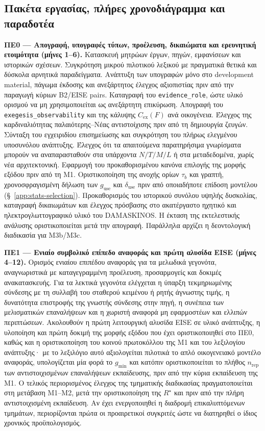 \documentclass[11pt,a4paper]{article}
\begin{document}
\subsection{Πακέτα εργασίας, πλήρες χρονοδιάγραμμα και παραδοτέα}\label{app:impl-wp}

\textbf{ΠΕ0 --- Απογραφή, υπογραφές τύπων, προέλευση, δικαιώματα και ερευνητική ετοιμότητα (μήνες 1--6).} Κατασκευή μητρώων έργων, πηγών, εμφανίσεων και ιστορικών σχέσεων. Συγκρότηση μικρού πιλοτικού λεξικού με πραγματικά θετικά και δύσκολα αρνητικά παραδείγματα. Ανάπτυξη των υπογραφών μόνο στο development material, πάγωμα έκδοσης και ανεξάρτητος έλεγχος αξιοπιστίας πριν από την παραγωγή κύριων B2/EISE pairs. Καταγραφή του \texttt{evidence\_role}, ώστε υλικό ορισμού να μη χρησιμοποιείται ως ανεξάρτητη επικύρωση. Απογραφή του \texttt{exegesis\_observability} και της κάλυψης $C_{\mathrm{ex}}(F)$ ανά οικογένεια. Έλεγχος της καρδιναλιότητας παλαιότερης--Νέας αντιστοίχισης πριν από τη δημιουργία ζευγών. Σύνταξη του εγχειριδίου επισημείωσης και συγκρότηση του πλήρως ελεγμένου υποσυνόλου ανάπτυξης. Έλεγχος ότι τα απαιτούμενα παρατηρήσιμα γνωρίσματα μπορούν να αναπαρασταθούν στα υπάρχοντα $N/T/M/L$ ή στα μεταδεδομένα, χωρίς νέα αρχιτεκτονική. Εφαρμογή του προκαθορισμένου κανόνα επιλογής της μορφής εξόδου πριν από τη M1. Οριστικοποίηση της ανοχής ορίων $\tau_b$ και γραπτή, χρονοσφραγισμένη δήλωση των $g_{\mathrm{use}}$ και $\delta_{\mathrm{use}}$ πριν από οποιαδήποτε επίδοση μοντέλου (§~\ref{app:stats-selection}). Προκαθορισμός του ιστορικού συνόλου υψηλής δυσκολίας, καταγραφή δικαιωμάτων και έλεγχος πρόσβασης στο ακατέργαστο ηχητικό και ηλεκτρογλωττογραφικό υλικό του DAMASKINOS. Η έκταση της εκτελεστικής ανάλυσης οριστικοποιείται μετά την απογραφή. Παράλληλα αρχίζει η δεοντολογική διαδικασία για M3b/M3c.

\textbf{ΠΕ1 --- Ενιαίο συμβολικό επίπεδο αναφοράς και πρώτη αλυσίδα EISE (μήνες 4--12).} Ορισμός ενιαίου επιπέδου αναφοράς για τα μελωδικά γεγονότα, αναγνωριστικά με καταγεγραμμένη προέλευση, προσαρμογείς και δοκιμές ανακατασκευής. Για τα λεκτικά γεγονότα ελέγχεται η ύπαρξη τεκμηριωμένης σύνδεσης με τη συλλαβή του σταθερού κειμένου ή ρητής άγνωστης τιμής, η δυνατότητα επιστροφής της γνωστής σύνδεσης στην πηγή, η συνέπεια των μελισματικών επαναλήψεων και η χωριστή αναφορά μη εφαρμοστέων και ελλιπών περιπτώσεων. Ακολουθούν η πρώτη λειτουργική αλυσίδα EISE σε υλικό ανάπτυξης, η υλοποίηση και πρώτη δοκιμή της μορφής εξόδου που έχει οριστικοποιηθεί στο ΠΕ0, καθώς και η οριστικοποίηση του κοινού πρωτοκόλλου της M1 και του λεξιλογίου ανάπτυξης· με το λεξιλόγιο αυτό αξιολογείται πιλοτικά το απλό οικογενειακό μοντέλο αναφοράς, υπολογίζεται μία φορά το $g_{\min}$ και κατόπιν οριστικοποιείται το πλήθος $n_{\mathrm{rep}}$ των αντιστοιχισμένων επαναλήψεων εκπαίδευσης, πριν από την κύρια εκπαίδευση της M1. Ο τελικός περιορισμένος έλεγχος της τμηματικής διαδικασίας πραγματοποιείται στη μετάβαση M1--M2, μετά την οριστικοποίηση της $R^\star$ και πριν από την πλήρη αντιστοιχισμένη εκπαίδευση. Αν έχει ενεργοποιηθεί η διαδρομή επικαλυπτόμενων τμημάτων, περιορίζονται πρώτα οι προαιρετικοί συγκριτές ώστε να διατηρηθεί ο ίδιος χρονικός προϋπολογισμός.
\end{document}

